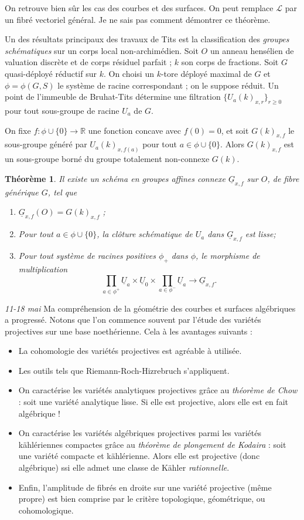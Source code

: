 \documentclass[11.8pt]{amsart}
\newcommand\R{\mathbb R}
\theoremstyle{plain}
\newtheorem{thm}{Théorème}[section]
\theoremstyle{definition}
\theoremstyle{remark}
\begin{document}
On retrouve bien sûr les cas des courbes et des surfaces. On peut remplace $\mathcal L$ par un fibré vectoriel général. Je ne sais pas comment démontrer ce théorème.


 \quad Un des résultats principaux des travaux de Tits est la classification des \textit{groupes schématiques} sur un corps local non-archimédien. Soit $O$ un anneau hensélien de valuation discrète et de corps résiduel parfait ; $k$ son corps de fractions. Soit $G$ quasi-déployé réductif sur $k$. On choisi un $k$-tore déployé maximal de $G$ et $\phi = \phi(G,S)$ le système de racine correspondant ; on le suppose réduit. Un point de l'immeuble de Bruhat-Tits détermine une filtration $\{U_a(k)_{x,r}\}_{r\ge 0}$ pour tout sous-groupe de racine $U_a$ de $G$.

On fixe $f : \phi \cup \{0\} \to \R$ une fonction concave avec $f(0) = 0$, et soit $G(k)_{x,f}$ le sous-groupe généré par $U_a(k)_{x,f(a)}$ pour tout $a \in  \phi \cup \{0\}$. Alors $G(k)_{x,f}$ est un sous-groupe borné du groupe totalement non-connexe $G(k)$.
\begin{thm} Il existe un schéma en groupes affines connexe $\underline{G}_{x,f}$ sur $O$, de fibre générique $G$, tel que \begin{enumerate}
\item $\underline{G}_{x,f}(O) = G(k)_{x,f}$ ;
\item Pour tout $a \in \phi \cup \{0\}$, la clôture schématique de $U_a$ dans $\underline G_{x,f}$ est lisse;
\item Pour tout système de racines positives $\phi_+$ dans $\phi$, le morphisme de multiplication $$\prod_{a\in \phi^+} \underline{U}_a\times \underline U_0 \times \prod_{a\in \phi^-} \underline{U}_a \to \underline{G}_{x,f}.$$
\end{enumerate}
\end{thm}

\textsl{11-18 mai} \quad Ma compréhension de la géométrie des courbes et surfaces algébriques a progressé. Notons que l'on commence souvent par l'étude des variétés projectives sur une base noethérienne. Cela à les avantages suivants : \begin{itemize}
\item La cohomologie des variétés projectives est agréable à utilisée.
\item Les outils tels que Riemann-Roch-Hizrebruch s'appliquent.
\item On caractérise les variétés analytiques projectives grâce au \textit{théorème de Chow} : soit une variété analytique lisse. Si elle est projective, alors elle est en fait algébrique !   
\item On caractérise les variétés algébriques projectives parmi les variétés kählériennes compactes grâce au \textit{théorème de plongement de Kodaira} : soit une variété compacte et kählérienne. Alors elle est projective (donc algébrique) ssi elle admet une classe de Kähler \textit{rationnelle}. 
\item Enfin, l'amplitude de fibrés en droite sur une variété projective (même propre) est bien comprise par le critère topologique, géométrique, ou cohomologique.
\end{itemize} 
\end{document}
